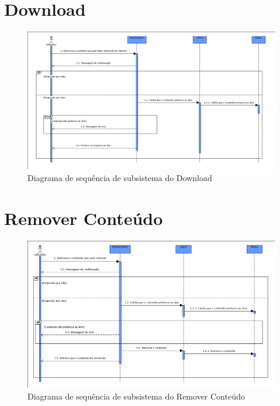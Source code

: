 \documentclass[a4paper]{report}
\begin{document}
\section{Download}
\begin{figure}[H]
	\centering 
    \includegraphics[width=\textwidth]{images/downloadSub.png}  
    \caption{Diagrama de sequência de subsistema do Download}
\end{figure}

\section{Remover Conteúdo}
\begin{figure}[H]
	\centering 
    \includegraphics[width=\textwidth]{images/remconteudoSub.png}  
    \caption{Diagrama de sequência de subsistema do Remover Conteúdo}
\end{figure}
\end{document}
